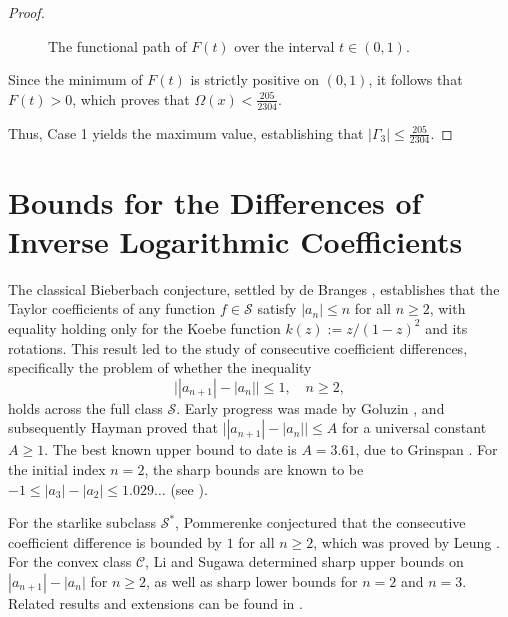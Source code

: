 \documentclass[11pt]{article}
\numberwithin{equation}{section}
\begin{document}
\begin{proof}
\begin{figure}[htbp]
\centering
{}
\caption{The functional path of $F(t)$ over the interval $t \in (0,1)$.}
\label{fig:polynomial_landscape}
\end{figure}

Since the minimum of $F(t)$ is strictly positive on $(0,1)$, it follows that $F(t) > 0$, which proves that $\Omega(x) < \frac{205}{2304}$.

Thus, Case 1 yields the maximum value, establishing that $|\Gamma_3| \le \frac{205}{2304}$.
\end{proof}

\section{Bounds for the Differences of Inverse Logarithmic Coefficients}
The classical Bieberbach conjecture, settled by de Branges \cite{LDB1}, establishes that the Taylor coefficients of any function $f \in \mathcal{S}$ satisfy $|a_n| \leq n$ for all $n \geq 2$, with equality holding only for the Koebe function $k(z) := z/(1-z)^2$ and its rotations. This result led to the study of consecutive coefficient differences, specifically the problem of whether the inequality
\[
\bigl||a_{n+1}| - |a_n|\bigr| \leq 1, \quad n \geq 2,
\]
holds across the full class $\mathcal{S}$. Early progress was made by Goluzin \cite{G1}, and subsequently Hayman \cite{H} proved that $\bigl||a_{n+1}| - |a_n|\bigr| \leq A$ for a universal constant $A \geq 1$. The best known upper bound to date is $A = 3.61$, due to Grinspan \cite{G2}. For the initial index $n=2$, the sharp bounds are known to be $-1 \leq |a_3| - |a_2| \leq 1.029\ldots$ (see \cite[Theorem 3.11]{PLD1}).

For the starlike subclass $\mathcal{S}^\ast$, Pommerenke \cite{Pommerenke1971} conjectured that the consecutive coefficient difference is bounded by $1$ for all $n \geq 2$, which was proved by Leung \cite{Leung1978}. For the convex class $\mathcal{C}$, Li and Sugawa \cite{LiSugawa} determined sharp upper bounds on $|a_{n+1}| - |a_n| $ for $n \geq 2$, as well as sharp lower bounds for $n=2$ and $n=3$. Related results and extensions can be found in \cite{Peng2019, Arora2019, Arora2023}.
\end{document}
